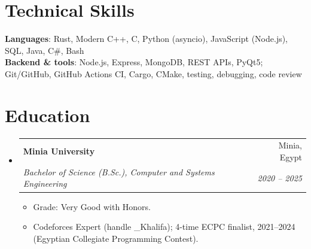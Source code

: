 \documentclass[letterpaper,11pt]{article}
\makeatletter
\newcommand{\resumeItem}[1]{
  \item\small{
    {#1 \vspace{-2pt}}
  }
}
\newcommand{\resumeSubheading}[4]{
  \vspace{-2pt}\item
    \begin{tabular*}{0.97\textwidth}[t]{l@{\extracolsep{\fill}}r}
      \textbf{#1} & #2 \\
      \textit{\small#3} & \textit{\small #4} \\
    \end{tabular*}\vspace{-7pt}
}
\newcommand{\resumeSubHeadingListStart}{\begin{itemize}[leftmargin=0.15in, label={}]}
\newcommand{\resumeSubHeadingListEnd}{\end{itemize}}
\newcommand{\resumeItemListStart}{\begin{itemize}}
\newcommand{\resumeItemListEnd}{\end{itemize}\vspace{-5pt}}
\makeatother
\begin{document}
%
\section{Technical Skills}
 \begin{itemize}[leftmargin=0.15in, label={}]
    \small{\item{
     \textbf{Languages}{: Rust, Modern C++, C, Python (asyncio), JavaScript (Node.js), SQL, Java, C\#, Bash} \\
     \textbf{Backend \& tools}{: Node.js, Express, MongoDB, REST APIs, PyQt5; Git/GitHub, GitHub Actions CI, Cargo, CMake, testing, debugging, code review}
    }}
 \end{itemize}

\section{Education}
  \resumeSubHeadingListStart
    \resumeSubheading
      {Minia University}{Minia, Egypt}
      {Bachelor of Science (B.Sc.), Computer and Systems Engineering}{2020 -- 2025}
      \resumeItemListStart
        \resumeItem{Grade: Very Good with Honors.}
        \resumeItem{Codeforces Expert (handle \_Khalifa); 4-time ECPC finalist, 2021--2024 (Egyptian Collegiate Programming Contest).}
      \resumeItemListEnd
  \resumeSubHeadingListEnd


\end{document}
